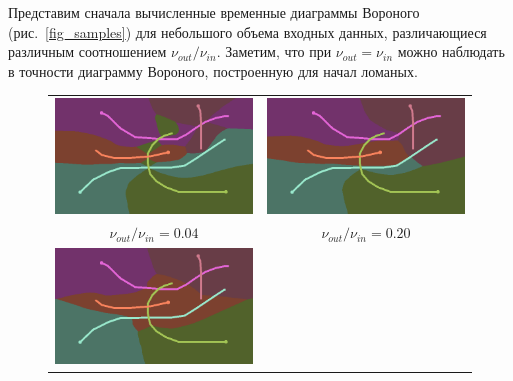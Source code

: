 \documentclass[12pt]{article}
\begin{document}
Представим сначала вычисленные временные диаграммы Вороного (рис.~\ref{fig_samples}) 
для небольшого объема входных данных, различающиеся различным 
соотношением $\nu_{out}/\nu_{in}$. Заметим, что при $\nu_{out} = \nu_{in}$ 
можно наблюдать в точности диаграмму Вороного, построенную 
для начал ломаных.

\begin{figure}
\begin{center}
\begin{tabular}{c c}
\includegraphics[scale=0.2]{sample004.png} &
\includegraphics[scale=0.2]{sample020.png} \\
$\nu_{out} / \nu_{in} = 0.04$ & $\nu_{out} / \nu_{in} = 0.20$ \\
\includegraphics[scale=0.2]{sample050.png} &

\end{tabular}
\end{center}
\end{figure}
\end{document}
